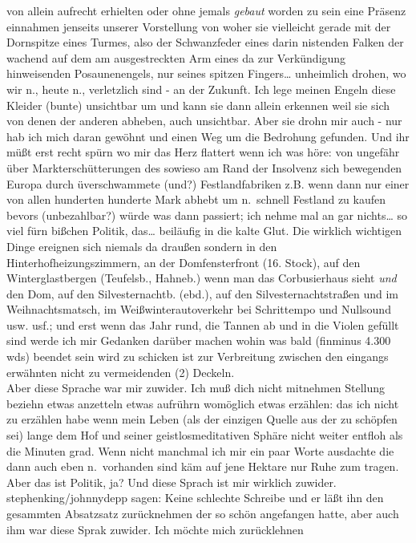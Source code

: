 \documentclass[
]{article}
\begin{document}
von allein aufrecht erhielten oder ohne jemals \emph{gebaut} worden zu
sein eine Präsenz einnahmen jenseits unserer Vorstellung von woher sie
vielleicht gerade mit der Dornspitze eines Turmes, also der Schwanzfeder
eines darin nistenden Falken der wachend auf dem am ausgestreckten Arm
eines da zur Verkündigung hinweisenden Posaunenengels, nur seines
spitzen Fingers\ldots{} unheimlich drohen, wo wir n., heute n.,
verletzlich sind - an der Zukunft. Ich lege meinen Engeln diese Kleider
(bunte) unsichtbar um und kann sie dann allein erkennen weil sie sich
von denen der anderen abheben, auch unsichtbar. Aber sie drohn mir auch
- nur hab ich mich daran gewöhnt und einen Weg um die Bedrohung
gefunden. Und ihr müßt erst recht spürn wo mir das Herz flattert wenn
ich was höre: von ungefähr über Markterschütterungen des sowieso am Rand
der Insolvenz sich bewegenden Europa durch üverschwammete (und?)
Festlandfabriken z.B. wenn dann nur einer von allen hunderten hunderte
Mark abhebt um n.~schnell Festland zu kaufen bevors (unbezahlbar?) würde
was dann passiert; ich nehme mal an gar nichts\ldots{} so viel fürn
bißchen Politik, das\ldots{} beiläufig in die kalte Glut. Die wirklich
wichtigen Dinge ereignen sich niemals da draußen sondern in den
Hinterhofheizungszimmern, an der Domfensterfront (16. Stock), auf den
Winterglastbergen (Teufelsb., Hahneb.) wenn man das Corbusierhaus sieht
\emph{und} den Dom, auf den Silvesternachtb. (ebd.), auf den
Silvesternachtstraßen und im Weihnachtsmatsch, im Weißwinterautoverkehr
bei Schrittempo und Nullsound usw. usf.; und erst wenn das Jahr rund,
die Tannen ab und in die Violen gefüllt sind werde ich mir Gedanken
darüber machen wohin was bald (finminus 4.300 wds) beendet sein wird zu
schicken ist zur Verbreitung zwischen den eingangs erwähnten nicht zu
vermeidenden (2) Deckeln.\\
Aber diese Sprache war mir zuwider. Ich muß dich nicht mitnehmen
Stellung beziehn etwas anzetteln etwas aufrührn womöglich etwas
erzählen: das ich nicht zu erzählen habe wenn mein Leben (als der
einzigen Quelle aus der zu schöpfen sei) lange dem Hof und seiner
geistlosmeditativen Sphäre nicht weiter entfloh als die Minuten grad.
Wenn nicht manchmal ich mir ein paar Worte ausdachte die dann auch eben
n.~vorhanden sind käm auf jene Hektare nur Ruhe zum tragen. Aber das ist
Politik, ja? Und diese Sprach ist mir wirklich zuwider.
stephenking/johnnydepp sagen: Keine schlechte Schreibe und er läßt ihn
den gesammten Absatzsatz zurücknehmen der so schön angefangen hatte,
aber auch ihm war diese Sprak zuwider. Ich möchte mich zurücklehnen
\end{document}
